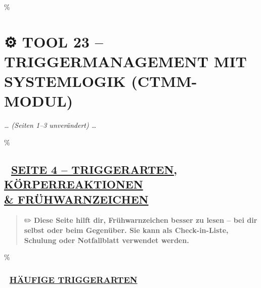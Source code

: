 \hypertarget{tool-23-triggermanagement-mit-systemlogik-ctmm-modul}{\%
\section{\texorpdfstring{\textbf{⚙️ TOOL 23 -- TRIGGERMANAGEMENT MIT SYSTEMLOGIK (CTMM-MODUL)}}{⚙️ TOOL 23 -- TRIGGERMANAGEMENT MIT SYSTEMLOGIK (CTMM-MODUL)}}\label{tool-23-triggermanagement-mit-systemlogik-ctmm-modul}}

\emph{\ldots{} (Seiten 1--3 unverändert) \ldots{}}

\hypertarget{seite-4-triggerarten-kuxf6rperreaktionen-fruxfchwarnzeichen}{\%
\subsection{\texorpdfstring{\textbf{🧠 \ul{SEITE 4 -- TRIGGERARTEN, KÖRPERREAKTIONEN \\& FRÜHWARNZEICHEN}}}{🧠 SEITE 4 -- TRIGGERARTEN, KÖRPERREAKTIONEN \\& FRÜHWARNZEICHEN}}\label{seite-4-triggerarten-kuxf6rperreaktionen-fruxfchwarnzeichen}}

\begin{quote}
✏️ \textbf{Diese Seite hilft dir, Frühwarnzeichen besser zu lesen -- bei dir selbst oder beim Gegenüber. Sie kann als Check-in-Liste, Schulung oder Notfallblatt verwendet werden.}
\end{quote}

\hypertarget{huxe4ufige-triggerarten}{\%
\subsubsection{\texorpdfstring{\textbf{🚨 \ul{HÄUFIGE TRIGGERARTEN}}}{🚨 HÄUFIGE TRIGGERARTEN}}\label{huxe4ufige-triggerarten}}

